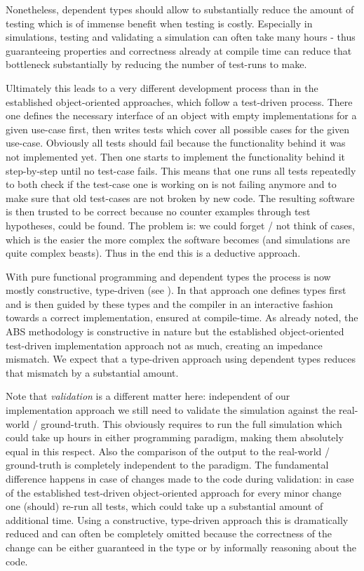 Nonetheless, dependent types should allow to substantially reduce the amount of testing which is of immense benefit when testing is costly. Especially in simulations, testing and validating a simulation can often take many hours - thus guaranteeing properties and correctness already at compile time can reduce that bottleneck substantially by reducing the number of test-runs to make.

Ultimately this leads to a very different development process than in the established object-oriented approaches, which follow a test-driven process. There one defines the necessary interface of an object with empty implementations for a given use-case first, then writes tests which cover all possible cases for the given use-case. Obviously all tests should fail because the functionality behind it was not implemented yet. Then one starts to implement the functionality behind it  step-by-step until no test-case fails. This means that one runs all tests repeatedly to both check if the test-case one is working on is not failing anymore and to make sure that old test-cases are not broken by new code. The resulting software is then trusted to be correct because no counter examples through test hypotheses, could be found. The problem is: we could forget / not think of cases, which is the easier the more complex the software becomes (and simulations are quite complex beasts). Thus in the end this is a deductive approach.

With pure functional programming and dependent types the process is now mostly constructive, type-driven (see \cite{brady_type-driven_2017}). In that approach one defines types first and is then guided by these types and the compiler in an interactive fashion towards a correct implementation, ensured at compile-time. As already noted, the ABS methodology is constructive in nature but the established object-oriented test-driven implementation approach not as much, creating an impedance mismatch. We expect that a type-driven approach using dependent types reduces that mismatch by a substantial amount.

Note that \textit{validation} is a different matter here: independent of our implementation approach we still need to validate the simulation against the real-world / ground-truth. This obviously requires to run the full simulation which could take up hours in either programming paradigm, making them absolutely equal in this respect. Also the comparison of the output to the real-world / ground-truth is completely independent to the paradigm. The fundamental difference happens in case of changes made to the code during validation: in case of the established test-driven object-oriented approach for every minor change one (should) re-run all tests, which could take up a substantial amount of additional time. Using a constructive, type-driven approach this is dramatically reduced and can often be completely omitted because the correctness of the change can be either guaranteed in the type or by informally reasoning about the code.


